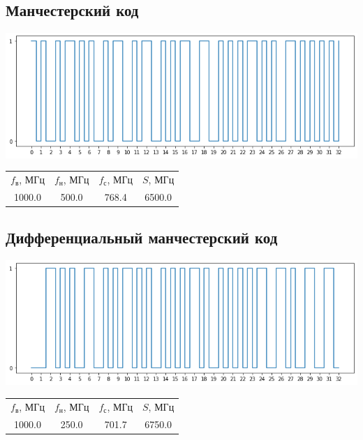 \subsection{Манчестерский код}
\includegraphics[width=\textwidth]{3manchester}
\begin{center}
    \begin{tabular}{cccc}
        $f_\mathrm{\text{в}}$, МГц & $f_\mathrm{\text{н}}$, МГц & $f_\mathrm{\text{с}}$, МГц & $S$, МГц \\
        1000.0 & 500.0 & 768.4 & 6500.0 \\
    \end{tabular}
\end{center}

\subsection{Дифференциальный манчестерский код}
\includegraphics[width=\textwidth]{3manchester_diff}
\begin{center}
    \begin{tabular}{cccc}
        $f_\mathrm{\text{в}}$, МГц & $f_\mathrm{\text{н}}$, МГц & $f_\mathrm{\text{с}}$, МГц & $S$, МГц \\
        1000.0 & 250.0 & 701.7 & 6750.0 \\
    \end{tabular}
\end{center}


